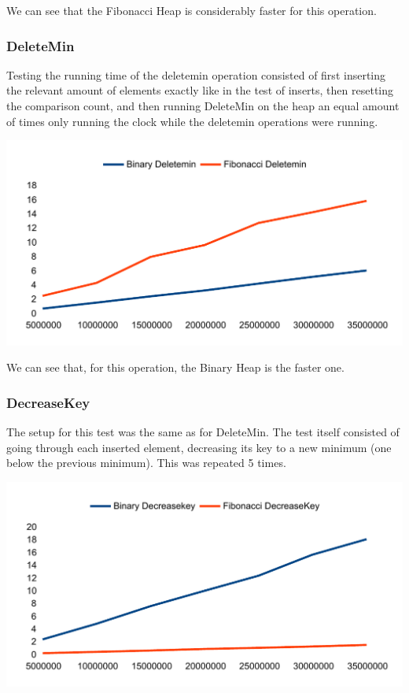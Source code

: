 We can see that the Fibonacci Heap is considerably faster for this operation.

\subsubsection{DeleteMin}
Testing the running time of the deletemin operation consisted of first inserting the relevant amount of elements exactly like in the test of inserts, then resetting the comparison count, and then running DeleteMin on the heap an equal amount of times only running the clock while the deletemin operations were running.

\includegraphics[width=\textwidth]{graphs/deletemin_graph.pdf}

We can see that, for this operation, the Binary Heap is the faster one.

\subsubsection{DecreaseKey}
The setup for this test was the same as for DeleteMin. The test itself consisted of going through each inserted element, decreasing its key to a new minimum (one below the previous minimum). This was repeated 5 times.

\includegraphics[width=\textwidth]{graphs/decreasekey_graph.pdf}

